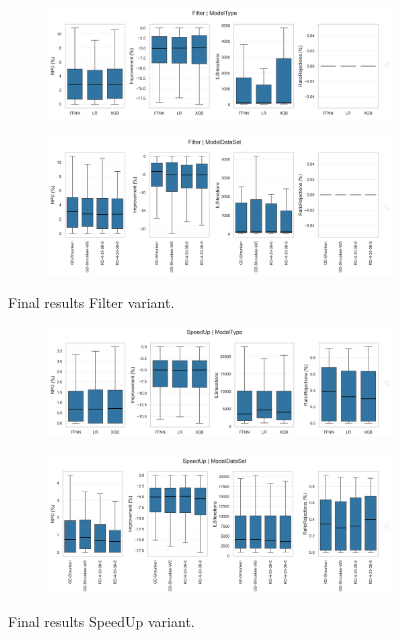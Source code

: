 \begin{figure}[!ht]
	\centering
	\begin{subfigure}[t]{\textwidth}
		\centering
		\includegraphics[width=0.9\linewidth]{pictures/final_results/ModelType_Filter_boxplot_final_results.png}
	\end{subfigure}
	\begin{subfigure}[t]{\textwidth}
		\centering
		\includegraphics[width=0.9\linewidth]{pictures/final_results/ModelDataSet_Filter_boxplot_final_results.png}
	\end{subfigure}
	\caption{Final results Filter variant.}
	\label{fig:final_results_filter_variant}
\end{figure}

\begin{figure}[!ht]
	\centering
	\begin{subfigure}[t]{\textwidth}
		\centering
		\includegraphics[width=0.9\linewidth]{pictures/final_results/ModelType_SpeedUp_boxplot_final_results.png}
	\end{subfigure}
	\begin{subfigure}[t]{\textwidth}
		\centering
		\includegraphics[width=0.9\linewidth]{pictures/final_results/ModelDataSet_SpeedUp_boxplot_final_results.png}
	\end{subfigure}
	\caption{Final results SpeedUp variant.}
	\label{fig:final_results_speedup_variant}
\end{figure}

